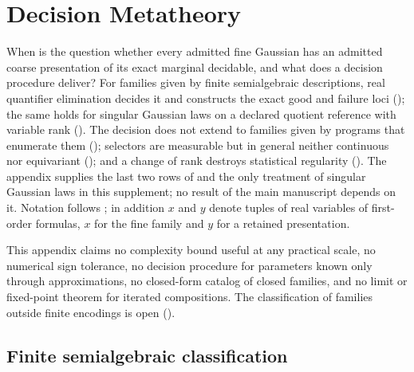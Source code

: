 \chapter{Decision Metatheory}
\label{app:decision-metatheory}

When is the question whether every admitted fine Gaussian has an admitted
coarse presentation of its exact marginal decidable, and what does a decision
procedure deliver? For families given by finite semialgebraic descriptions,
real quantifier elimination decides it and constructs the exact good and
failure loci (); the same holds
for singular Gaussian laws on a declared quotient reference with variable rank
(). The decision does not extend
to families given by programs that enumerate them
(); selectors are measurable but in
general neither continuous nor equivariant
(); and a change of rank destroys
statistical regularity ().
The appendix supplies the last two rows of  and the
only treatment of singular Gaussian laws in this supplement; no result of the
main manuscript depends on it. Notation follows
; in addition \(x\) and \(y\) denote tuples of
real variables of first-order formulas, \(x\) for the fine family and \(y\) for
a retained presentation.

This appendix claims no complexity bound useful at any practical scale, no
numerical sign tolerance, no decision procedure for parameters known only
through approximations, no closed-form catalog of closed families, and no limit
or fixed-point theorem for iterated compositions. The classification of
families outside finite encodings is open
(). 

\section{Finite semialgebraic classification}
\label{sec:cg-semialgebraic-kron}

